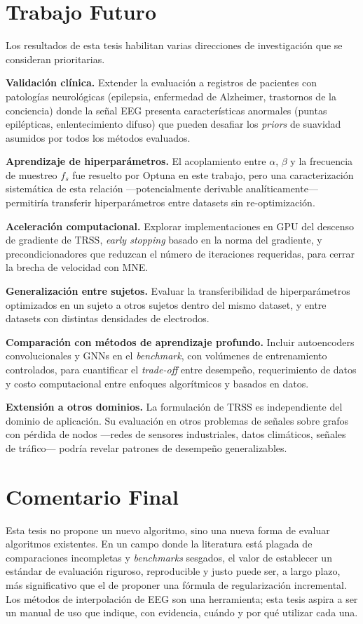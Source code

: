 \section{Trabajo Futuro}

Los resultados de esta tesis habilitan varias direcciones de investigación que se consideran prioritarias.

\textbf{Validación clínica.} Extender la evaluación a registros de pacientes con patologías neurológicas (epilepsia, enfermedad de Alzheimer, trastornos de la conciencia) donde la señal EEG presenta características anormales (puntas epilépticas, enlentecimiento difuso) que pueden desafiar los \textit{priors} de suavidad asumidos por todos los métodos evaluados.

\textbf{Aprendizaje de hiperparámetros.} El acoplamiento entre $\alpha$, $\beta$ y la frecuencia de muestreo $f_s$ fue resuelto por Optuna en este trabajo, pero una caracterización sistemática de esta relación —potencialmente derivable analíticamente— permitiría transferir hiperparámetros entre datasets sin re-optimización.

\textbf{Aceleración computacional.} Explorar implementaciones en GPU del descenso de gradiente de TRSS, \textit{early stopping} basado en la norma del gradiente, y precondicionadores que reduzcan el número de iteraciones requeridas, para cerrar la brecha de velocidad con MNE.

\textbf{Generalización entre sujetos.} Evaluar la transferibilidad de hiperparámetros optimizados en un sujeto a otros sujetos dentro del mismo dataset, y entre datasets con distintas densidades de electrodos.

\textbf{Comparación con métodos de aprendizaje profundo.} Incluir autoencoders convolucionales y GNNs en el \textit{benchmark}, con volúmenes de entrenamiento controlados, para cuantificar el \textit{trade-off} entre desempeño, requerimiento de datos y costo computacional entre enfoques algorítmicos y basados en datos.

\textbf{Extensión a otros dominios.} La formulación de TRSS es independiente del dominio de aplicación. Su evaluación en otros problemas de señales sobre grafos con pérdida de nodos —redes de sensores industriales, datos climáticos, señales de tráfico— podría revelar patrones de desempeño generalizables.

\section{Comentario Final}

Esta tesis no propone un nuevo algoritmo, sino una nueva forma de evaluar algoritmos existentes. En un campo donde la literatura está plagada de comparaciones incompletas y \textit{benchmarks} sesgados, el valor de establecer un estándar de evaluación riguroso, reproducible y justo puede ser, a largo plazo, más significativo que el de proponer una fórmula de regularización incremental. Los métodos de interpolación de EEG son una herramienta; esta tesis aspira a ser un manual de uso que indique, con evidencia, cuándo y por qué utilizar cada una.